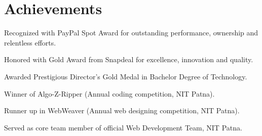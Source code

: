 \documentclass[]{rajnikant-resume-openfont}
\begin{document}
\begin{minipage}[t]{0.66\textwidth}
\section{Achievements} 
\sectionsep
\begin{tightemize}
	\item Recognized with PayPal Spot Award for outstanding performance, ownership and relentless efforts.
	\item Honored with Gold Award from Snapdeal for excellence, innovation and quality.
	\item Awarded Prestigious Director's Gold Medal in Bachelor Degree of Technology.
	\item Winner of Algo-Z-Ripper (Annual coding competition, NIT Patna).
	\item Runner up in WebWeaver (Annual web designing competition, NIT Patna).
	\item Served as core team member of official Web Development Team, NIT Patna.
	
\end{tightemize}
\sectionsep



\end{minipage} 
\end{document}

